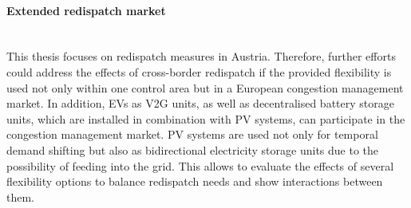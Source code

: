 \paragraph*{Extended redispatch market}\mbox{}\\
This thesis focuses on redispatch measures in Austria. Therefore, further efforts could address the effects of cross-border redispatch if the provided flexibility is used not only within one control area but in a European congestion management market. In addition, \ac{EV}s as \ac{V2G} units, as well as decentralised battery storage units, which are installed in combination with \ac{PV} systems, can participate in the congestion management market. \ac{PV} systems are used not only for temporal demand shifting but also as bidirectional electricity storage units due to the possibility of feeding into the grid. This allows to evaluate the effects of several flexibility options to balance redispatch needs and show interactions between them. 

